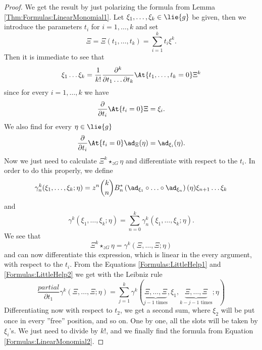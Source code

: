 \begin{proof}
	We get the result by just polarizing the formula from Lemma 
	\ref{Thm:Formulas:LinearMonomial1}. Let $\xi_1, \ldots, \xi_k \in 
	\lie{g}$ be given, then we introduce the parameters $t_i$ for $i = 
	1, \ldots, k$ and set
	\begin{equation*}
		\Xi
		=		
		\Xi(t_1, \ldots, t_k)
		=
		\sum\limits_{i=1}^k t_i \xi^k.
	\end{equation*}
	Then it is immediate to see that
	\begin{equation*}
		\xi_1 \ldots \xi_k
		=
		\frac{1}{k!}
		\frac{\partial^k}{\partial t_1 \ldots \partial t_k}
		\At{t_1, \ldots, t_k = 0}
		\Xi^k
	\end{equation*}
	since for every $i = 1, \ldots, k$ we have
	\begin{equation}\label{Formulas:LittleHelp1}
		\frac{\partial}{\partial t_i}
		\At{t_i = 0} \Xi
		=
		\xi_i.
	\end{equation}
	We also find for every $\eta \in \lie{g}$
	\begin{equation}\label{Formulas:LittleHelp2}
		\frac{\partial}{\partial t_i}
		\At{t_i = 0} \ad_{\Xi}(\eta)
		=
		\ad_{\xi_i}(\eta).
	\end{equation}
	Now we just need to calculate $\Xi^k \star_{zG} \eta$ and 
	differentiate with respect to the $t_i$. In order to do this 
	properly, we define
	\begin{equation*}
		\gamma_n^k
		(\xi_1, \ldots, \xi_k; \eta)
		=
		z^n \binom{k}{n} B_n^*
		\left( 
			\ad_{\xi_1} 
			\circ \ldots \circ 
			\ad_{\xi_n}
		\right)
		(\eta)
		\xi_{n+1} \ldots \xi_k
	\end{equation*}
	and
	\begin{equation*}
		\gamma^k
		(\xi_1, \ldots, \xi_k; \eta)
		=
		\sum\limits_{n = 0}^k
		\gamma_n^k
		(\xi_1, \ldots, \xi_k; \eta).
	\end{equation*}
	We see that
	\begin{equation*}
		\Xi^k \star_{zG} \eta
		=
		\gamma^k
		(\Xi, \ldots, \Xi; \eta)
	\end{equation*}
	and can now differentiate this expression, which is linear in the 
	every argument, with respect to the $t_i$. From the Equations 
	\eqref{Formulas:LittleHelp1} and \eqref{Formulas:LittleHelp2} we get 
	with the Leibniz rule
	\begin{equation*}
		\frac{partial}{\partial t_1}
		\gamma^k
		(\Xi, \ldots, \Xi; \eta)
		=
		\sum\limits_{j = 1}^k
		\gamma^k
		(
			\underbrace{\Xi, \ldots, \Xi}_{
				j-1 \text{ times}
			}
			, \xi_1, 
			\underbrace{\Xi, \ldots, \Xi}_{
				k-j-1 \text{ times}
			}
			; \eta
		)
	\end{equation*}
	Differentiating now with respect to $t_2$, we get a second sum, 
	where $\xi_2$ will be put once in every ''free'' position, and so 
	on. One by one, all the slots will be taken by $\xi_i$'s. We just 
	need to divide by $k!$, and we finally find the formula from 
	Equation \eqref{Formulas:LinearMonomial2}.
\end{proof}



